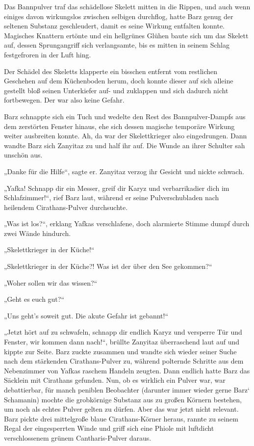 Das Bannpulver traf das schädellose Skelett mitten in die Rippen, und auch wenn einiges davon wirkungslos zwischen selbigen durchflog, hatte Barz genug der seltenen Substanz geschleudert, damit es seine Wirkung entfalten konnte. Magisches Knattern ertönte und ein hellgrünes Glühen baute sich um das Skelett auf, dessen Sprungangriff sich verlangsamte, bis es mitten in seinem Schlag festgefroren in der Luft hing.

Der Schädel des Skeletts klapperte ein bisschen entfernt vom restlichen Geschehen auf dem Küchenboden herum, doch konnte dieser auf sich alleine gestellt bloß seinen Unterkiefer auf- und zuklappen und sich dadurch nicht fortbewegen. Der war also keine Gefahr.

Barz schnappte sich ein Tuch und wedelte den Rest des Bannpulver-Dampfs aus dem zerstörten Fenster hinaus, ehe sich dessen magische temporäre Wirkung weiter ausbreiten konnte. Ah, da war der Skelettkrieger also eingedrungen. Dann wandte Barz sich Zanyitaz zu und half ihr auf. Die Wunde an ihrer Schulter sah unschön aus.

„Danke für die Hilfe“, sagte er. Zanyitaz verzog ihr Gesicht und nickte schwach.

„Yafka! Schnapp dir ein Messer, greif dir Karyz und verbarrikadier dich im Schlafzimmer!“, rief Barz laut, während er seine Pulverschubladen nach heilendem Cirathans-Pulver durchsuchte.

„Was ist los?“, erklang Yafkas verschlafene, doch alarmierte Stimme dumpf durch zwei Wände hindurch.

„Skelettkrieger in der Küche!“

„Skelettkrieger in der Küche?! Was ist der über den See gekommen?“

„Woher sollen wir das wissen?“

„Geht es euch gut?“

„Uns geht’s soweit gut. Die akute Gefahr ist gebannt!“

„Jetzt hört auf zu schwafeln, schnapp dir endlich Karyz und versperre Tür und Fenster, wir kommen dann nach!“, brüllte Zanyitaz überraschend laut auf und kippte zur Seite. Barz zuckte zusammen und wandte sich wieder seiner Suche nach dem stärkenden Cirathans-Pulver zu, während polternde Schritte aus dem Nebenzimmer von Yafkas raschem Handeln zeugten. Dann endlich hatte Barz das Säcklein mit Cirathans gefunden. Nun, ob es wirklich ein Pulver war, war debattierbar, für manch peniblen Beobachter (darunter immer wieder gerne Barz‘ Schamanin) mochte die grobkörnige Substanz aus zu großen Körnern bestehen, um noch als echtes Pulver gelten zu dürfen. Aber das war jetzt nicht relevant. Barz pickte drei mittelgroße blaue Cirathans-Körner heraus, rannte zu seinem Regal der eingesperrten Winde und griff sich eine Phiole mit luftdicht verschlossenem grünem Cantharis-Pulver daraus.

